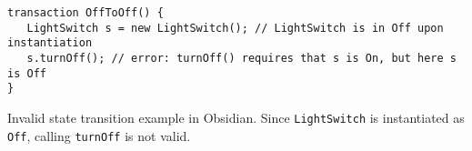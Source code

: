 \begin{listing}
    \centering
    \begin{verbatim}
transaction OffToOff() {
   LightSwitch s = new LightSwitch(); // LightSwitch is in Off upon instantiation
   s.turnOff(); // error: turnOff() requires that s is On, but here s is Off
}
    \end{verbatim}
    \caption{Invalid state transition example in Obsidian. Since \texttt{LightSwitch} is instantiated as \texttt{Off}, calling \texttt{turnOff} is not valid.}
    \label{lst:obsidian-transaction-err}
\end{listing}
